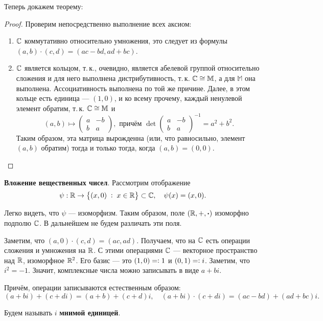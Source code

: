 Теперь докажем теорему:

\begin{proof}
    Проверим непосредственно выполнение всех аксиом:
    \begin{enumerate}
        \item $\mathbb{C}$ коммутативно относительно умножения, это следует из формулы $(a, b) \cdot (c, d) = (ac - bd, ad + bc)$.
        \item $\mathbb{C}$ является кольцом, т.\,к., очевидно, является абелевой группой относительно сложения и для него выполнена дистрибутивность, т.\,к. $\mathbb{C} \cong \mathbb{M}$, а для $\mathbb{M}$ она выполнена. Ассоциативность выполнена по той же причине. Далее, в этом кольце есть единица --- $(1, 0)$, и ко всему прочему, каждый ненулевой элемент обратим, т.\,к. $\mathbb{C} \cong \mathbb{M}$ и
            $$
            (a, b) \mapsto
            \begin{pmatrix}
                a & -b\\
                b & a
            \end{pmatrix},\text{{} причём {}}
            \det\begin{pmatrix}
                a & -b\\
                b & a
            \end{pmatrix}^{-1} = a^2 + b^2.
            $$
            Таким образом, эта матрица вырожденна (или, что равносильно, элемент $(a, b)$ обратим) тогда и только тогда, когда $(a, b) = (0, 0)$.
    \end{enumerate}
\end{proof}

\textbf{Вложение вещественных чисел}. Рассмотрим отображение
$$
\psi: \mathbb{R} \rightarrow \big\{(x, 0) \;\vcentcolon\;x \in \mathbb{R}\big\} \subset \mathbb{C},\quad \psi(x) = (x, 0).
$$

Легко видеть, что $\psi$ --- изоморфизм. Таким образом, поле $(\mathbb{R}, +, \boldsymbol{\cdot})$ изоморфно подполю $\mathbb{C}$. В дальнейшем не будем различать эти поля.

Заметим, что $(a, 0) \cdot (c, d) = (ac, ad)$. Получаем, что на $\mathbb{C}$ есть операции сложения и умножения на $\mathbb{R}$. С этими операциями $\mathbb{C}$ --- векторное пространство над $\mathbb{R}$, изоморфное $\mathbb{R}^2$. Его базис --- это $(1, 0) =\vcentcolon 1$ и $(0, 1) =\vcentcolon i$. Заметим, что $i^2 = -1$. Значит, комплексные числа можно записывать в виде $a + bi$.

Причём, операции записываются естественным образом:
$$
(a + bi) + (c + di) = (a + b) + (c + d)i,\quad (a + bi) \cdot (c + di) = (ac - bd) + (ad + bc)i.
$$

\begin{definition}
    Будем называть $i$ \textbf{мнимой единицей}.
\end{definition}


